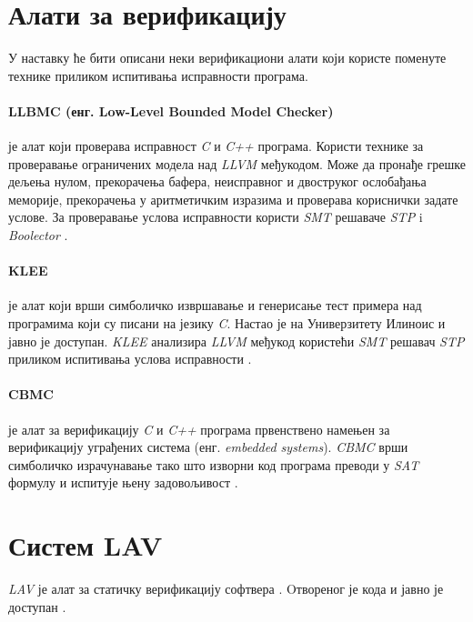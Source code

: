 \documentclass[12pt,oneside]{memoir}
\begin{document}
  \section{Алати за верификацију}
У наставку ће бити описани неки верификациони алати који користе поменуте технике приликом испитивања исправности програма. 

\paragraph{LLBMC (енг. Low-Level Bounded Model Checker)} је алат који проверава исправност 
\textit{C} и \textit{C++} програма. Користи технике за проверавање ограничених модела над \textit{LLVM} међукодом. Може да пронађе грешке дељења нулом, прекорачења бафера, неисправног и двоструког ослобађања меморије, прекорачења у аритметичким изразима и проверава кориснички задате услове. За проверавање услова исправности користи \textit{SMT} решаваче \textit{STP} i \textit{Boolector} \cite{llbmc}.

\paragraph{KLEE} је алат који врши симболичко извршавање и генерисање тест примера над програмима који су писани на језику \textit{C}. Настао је на Универзитету Илиноис и јавно је доступан. \emph{KLEE} анализира \emph{LLVM} међукод користећи \textit{SMT} решавач \textit{STP} приликом испитивања услова исправности \cite{klee}. 

\paragraph{CBMC} је алат за верификацију \textit{C} и \textit{C++} програма првенствено намењен за верификацију уграђених система (енг. \textit{embedded systems}). \textit{CBMC} врши симболичко израчунавање тако што изворни код програма преводи у \textit{SAT} формулу и испитује њену задовољивост \cite{cbmc}. 

\section{Систем LAV}
	\textit{LAV} је алат за статичку верификацију софтвера \cite{mvjphd}. Oтвореног је кода и јавно је доступан \cite{lav_online}. 
	
\end{document}
